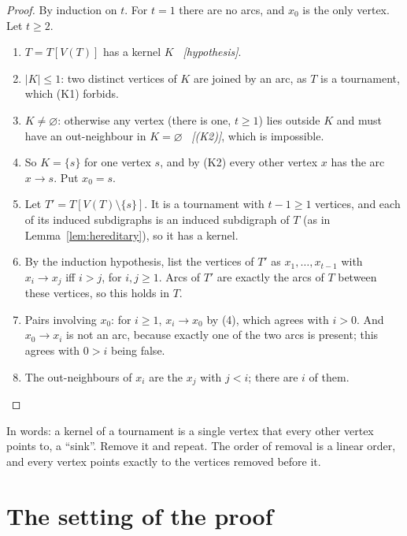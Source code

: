 \documentclass[11pt]{article}
\theoremstyle{plain}
\theoremstyle{definition}
\theoremstyle{remark}
\newcommand{\why}[1]{\unskip\ \textit{[#1]}}
\newenvironment{steps}{\begin{enumerate}[label=(\arabic*),leftmargin=2.2em,itemsep=0.35em]}{\end{enumerate}}
\begin{document}
\begin{proof}
By induction on $t$. For $t=1$ there are no arcs, and $x_0$ is the only vertex. Let $t\ge 2$.
\begin{steps}
  \item $T=T[V(T)]$ has a kernel $K$ \why{hypothesis}.
  \item $|K|\le 1$: two distinct vertices of $K$ are joined by an arc, as $T$ is a tournament,
    which (K1) forbids.
  \item $K\ne\varnothing$: otherwise any vertex (there is one, $t\ge 1$) lies outside $K$ and
    must have an out-neighbour in $K=\varnothing$ \why{(K2)}, which is impossible.
  \item So $K=\{s\}$ for one vertex $s$, and by (K2) every other vertex $x$ has the arc
    $x\to s$. Put $x_0=s$.
  \item Let $T'=T[V(T)\setminus\{s\}]$. It is a tournament with $t-1\ge 1$ vertices, and each of
    its induced subdigraphs is an induced subdigraph of $T$ (as in Lemma~\ref{lem:hereditary}),
    so it has a kernel.
  \item By the induction hypothesis, list the vertices of $T'$ as $x_1,\dots,x_{t-1}$ with
    $x_i\to x_j$ iff $i>j$, for $i,j\ge 1$. Arcs of $T'$ are exactly the arcs of $T$ between
    these vertices, so this holds in $T$.
  \item Pairs involving $x_0$: for $i\ge 1$, $x_i\to x_0$ by (4), which agrees with $i>0$. And
    $x_0\to x_i$ is not an arc, because exactly one of the two arcs is present; this agrees with
    $0>i$ being false.
  \item The out-neighbours of $x_i$ are the $x_j$ with $j<i$; there are $i$ of them. \qedhere
\end{steps}
\end{proof}

In words: a kernel of a tournament is a single vertex that every other vertex points to, a
``sink''. Remove it and repeat. The order of removal is a linear order, and every vertex points
exactly to the vertices removed before it.

\section{The setting of the proof}\label{sec:setting}
\end{document}

